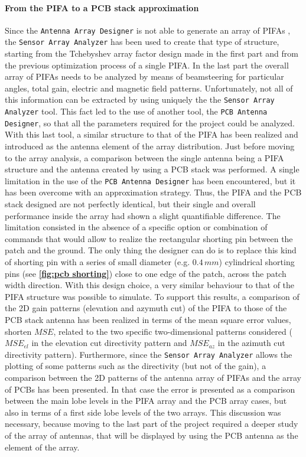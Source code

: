 \documentclass[12pt,a4paper]{article}
\begin{document}
{\begin{multicols}{2}
	\paragraph{\selectfont\color{Turquoise}From the PIFA to a PCB stack approximation}
Since the \texttt{\color{Mahogany}Antenna Array Designer} is not able to generate an array of PIFAs , the \texttt{\color{Mahogany}Sensor Array Analyzer} has been used to create that type of structure, starting from the Tchebyshev array factor design made in the first part and from the previous optimization process of a single PIFA. In the last part the overall array of PIFAs needs to be analyzed by means of beamsteering for particular angles, total gain, electric and magnetic field patterns. Unfortunately, not all of this information can be extracted by using uniquely the the \texttt{\color{Mahogany}Sensor Array Analyzer} tool. This fact led to the use of another tool, the \texttt{\color{Mahogany}PCB Antenna Designer}, so that all the parameters required for the project could be analyzed. With this last tool, a similar structure to that of the PIFA has been realized and introduced as the antenna element of the array distribution. Just before moving to the array analysis, a comparison between the single antenna being a PIFA structure and the antenna created by using a PCB stack was performed. A single limitation in the use of the \texttt{\color{Mahogany}PCB Antenna Designer} has been encountered, but it has been overcome with an approximation strategy. Thus, the PIFA and the PCB stack designed are not perfectly identical, but their single and overall performance inside the array had shown a slight quantifiable difference. The limitation consisted in the absence of a specific option or combination of commands that would allow to realize the rectangular shorting pin between the patch and the ground. The only thing the designer can do is to replace this kind of shorting pin with a series of small diameter (e.g. $0.4\,mm$) cylindrical shorting pins (see \textbf{\cref{fig:pcb shorting}}) close to one edge of the patch, across the patch width direction. With this design choice, a very similar behaviour to that of the PIFA structure was possible to simulate. To support this results, a comparison of the 2D gain patterns (elevation and azymuth cut) of the PIFA to those of the PCB stack antenna has been realized in terms of the mean square error values, shorten $MSE$, related to the two specific two-dimensional patterns considered ($MSE_{el}$ in the elevation cut directivity pattern and $MSE_{az}$ in the azimuth cut directivity pattern). Furthermore, since the \texttt{\color{Mahogany}Sensor Array Analyzer} allows the plotting of some patterns such as the directivity (but not of the gain), a comparison between the 2D patterns of the antenna array of PIFAs and the array of PCBs has been presented. In that case the error is presented as a comparison between the main lobe levels in the PIFA array and the PCB array cases, but also in terms of a first side lobe levels of the two arrays. This discussion was necessary, because moving to the last part of the project required a deeper study of the array of antennas, that will be displayed by using the PCB antenna as the element of the array. 

\end{multicols}}
\end{document}
